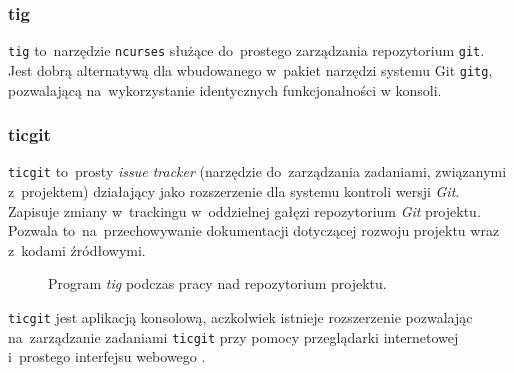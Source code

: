 \subsubsection{tig}

\texttt{tig} to~narzędzie \texttt{ncurses} służące do~prostego zarządzania repozytorium \texttt{git}. Jest dobrą alternatywą dla wbudowanego w~pakiet narzędzi systemu Git \texttt{gitg}, pozwalającą na~wykorzystanie identycznych funkcjonalności w konsoli.

\subsubsection{ticgit}

\texttt{ticgit} \cite{ticgit} to~prosty \textit{issue tracker} (narzędzie do~zarządzania zadaniami, związanymi z~projektem) działający jako rozszerzenie dla systemu kontroli wersji \textit{Git}. Zapisuje zmiany w~trackingu w~oddzielnej gałęzi repozytorium \textit{Git} projektu. Pozwala to~na~przechowywanie dokumentacji dotyczącej rozwoju projektu wraz z~kodami źródłowymi.

\begin{figure}[ht]
\centering
{}
\caption{Program \textit{tig} podczas pracy nad repozytorium projektu.}
\end{figure}

\texttt{ticgit} jest aplikacją konsolową, aczkolwiek istnieje rozszerzenie pozwalając na~zarządzanie zadaniami \texttt{ticgit} przy pomocy przeglądarki internetowej i~prostego interfejsu webowego \cite{ticgitweb}.

